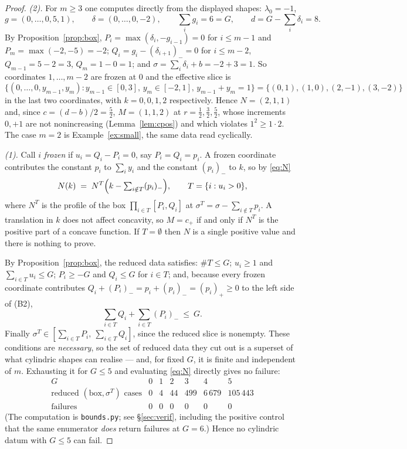 \documentclass[11pt]{article}
\theoremstyle{definition}
\newcommand{\pos}[1]{(#1)_{+}}
\newcommand{\nneg}[1]{(#1)_{-}}
\begin{document}
\begin{proof}
\emph{(2).} For $m\ge3$ one computes directly from the displayed shapes: $\lambda_0=-1$,
\[
  g=(0,\dots,0,5,1),\qquad \delta=(0,\dots,0,-2),\qquad \sum_ig_i=6=G,\qquad
  d=G-\textstyle\sum_i\delta_i=8 .
\]
By Proposition~\ref{prop:box}, $P_i=\max(\delta_i,-g_{i-1})=0$ for $i\le m-1$ and
$P_m=\max(-2,-5)=-2$; $Q_i=g_i-\nneg{\delta_{i+1}}=0$ for $i\le m-2$,
$Q_{m-1}=5-2=3$, $Q_m=1-0=1$; and $\sigma=\sum_i\delta_i+b=-2+3=1$. So coordinates
$1,\dots,m-2$ are frozen at $0$ and the effective slice is
\[
  \{(0,\dots,0,y_{m-1},y_m):y_{m-1}\in[0,3],\,y_m\in[-2,1],\,y_{m-1}{+}y_m{=}1\}
  =\{(0,1),(1,0),(2,{-}1),(3,{-}2)\}
\]
in the last two coordinates, with $k=0,0,1,2$ respectively. Hence $N=(2,1,1)$ and, since
$c=(d-b)/2=\tfrac52$, $M=(1,1,2)$ at $r=\tfrac12,\tfrac32,\tfrac52$, whose increments
$0,+1$ are not nonincreasing (Lemma~\ref{lem:cpos}) and which violates
$1^2\ge1\cdot2$. The case $m=2$ is Example~\ref{ex:small}, the same data read
cyclically.

\emph{(1).} Call $i$ \emph{frozen} if $u_i=Q_i-P_i=0$, say $P_i=Q_i=p_i$. A frozen
coordinate contributes the constant $p_i$ to $\sum_iy_i$ and the constant $\nneg{p_i}$ to
$k$, so by \eqref{eq:N}
\[
  N(k)\;=\;N^{T}\Bigl(k-\textstyle\sum_{i\notin T}\nneg{p_i}\Bigr),
  \qquad T=\{i:u_i>0\},
\]
where $N^T$ is the profile of the box $\prod_{i\in T}[P_i,Q_i]$ at
$\sigma^T=\sigma-\sum_{i\notin T}p_i$. A translation in $k$ does not affect concavity,
so $M=c_+$ if and only if $N^T$ is the positive part of a concave function. If
$T=\emptyset$ then $N$ is a single positive value and there is nothing to prove.

By Proposition~\ref{prop:box}, the reduced data satisfies: $\#T\le G$; $u_i\ge1$ and
$\sum_{i\in T}u_i\le G$; $P_i\ge-G$ and $Q_i\le G$ for $i\in T$; and, because every
frozen coordinate contributes $Q_i+\nneg{P_i}=p_i+\nneg{p_i}=\pos{p_i}\ge0$ to the left
side of (B2),
\[
  \sum_{i\in T}Q_i+\sum_{i\in T}\nneg{P_i}\ \le\ G .
\]
Finally $\sigma^T\in[\sum_{i\in T}P_i,\ \sum_{i\in T}Q_i]$, since the reduced slice is
nonempty. These conditions are \emph{necessary}, so the set of reduced data they cut out
is a superset of what cylindric shapes can realise --- and, for fixed $G$, it is finite
and independent of $m$. Exhausting it for $G\le5$ and evaluating \eqref{eq:N} directly
gives no failure:
\[
\begin{array}{r|rrrrrr}
 G & 0 & 1 & 2 & 3 & 4 & 5\\\hline
 \text{reduced }(\text{box},\sigma^T)\text{ cases} & 0 & 4 & 44 & 499 & 6\,679 & 105\,443\\
 \text{failures} & 0&0&0&0&0&0
\end{array}
\]
(The computation is \texttt{bounds.py}; see \S\ref{sec:verif}, including the positive
control that the same enumerator \emph{does} return failures at $G=6$.) Hence no
cylindric datum with $G\le5$ can fail.
\end{proof}
\end{document}

